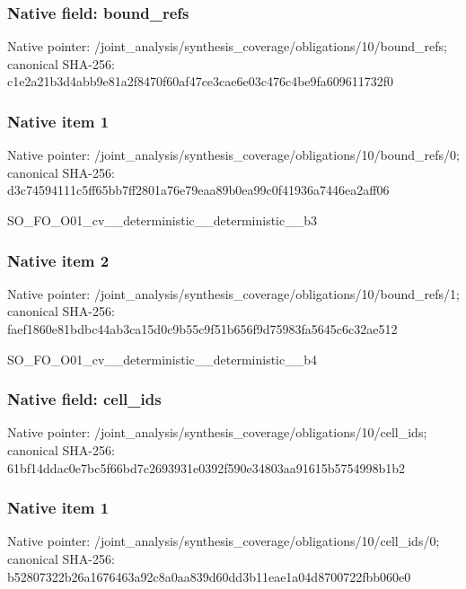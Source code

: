 \documentclass[10pt,a4paper]{article}
\begin{document}
\subsubsection{Native field: bound\_\allowbreak{}refs}
Native pointer: /joint\_\allowbreak{}analysis/synthesis\_\allowbreak{}coverage/obligations/10/bound\_\allowbreak{}refs; canonical SHA-256: c1e2a21b3d4abb9e81a2f8470f60af47ce3cae6e03c476c4be9fa609611732f0

\subsubsection{Native item 1}
Native pointer: /joint\_\allowbreak{}analysis/synthesis\_\allowbreak{}coverage/obligations/10/bound\_\allowbreak{}refs/0; canonical SHA-256: d3c74594111c5ff65bb7ff2801a76e79eaa89b0ea99c0f41936a7446ea2aff06

\begingroup\raggedright\sloppy SO\_\allowbreak{}FO\_\allowbreak{}O01\_\allowbreak{}cv\_\allowbreak{}\_\allowbreak{}deterministic\_\allowbreak{}\_\allowbreak{}deterministic\_\allowbreak{}\_\allowbreak{}b3\par\endgroup

\subsubsection{Native item 2}
Native pointer: /joint\_\allowbreak{}analysis/synthesis\_\allowbreak{}coverage/obligations/10/bound\_\allowbreak{}refs/1; canonical SHA-256: faef1860e81bdbc44ab3ca15d0c9b55c9f51b656f9d75983fa5645c6c32ae512

\begingroup\raggedright\sloppy SO\_\allowbreak{}FO\_\allowbreak{}O01\_\allowbreak{}cv\_\allowbreak{}\_\allowbreak{}deterministic\_\allowbreak{}\_\allowbreak{}deterministic\_\allowbreak{}\_\allowbreak{}b4\par\endgroup

\subsubsection{Native field: cell\_\allowbreak{}ids}
Native pointer: /joint\_\allowbreak{}analysis/synthesis\_\allowbreak{}coverage/obligations/10/cell\_\allowbreak{}ids; canonical SHA-256: 61bf14ddac0e7bc5f66bd7c2693931e0392f590e34803aa91615b5754998b1b2

\subsubsection{Native item 1}
Native pointer: /joint\_\allowbreak{}analysis/synthesis\_\allowbreak{}coverage/obligations/10/cell\_\allowbreak{}ids/0; canonical SHA-256: b52807322b26a1676463a92c8a0aa839d60dd3b11eae1a04d8700722fbb060e0
\end{document}
